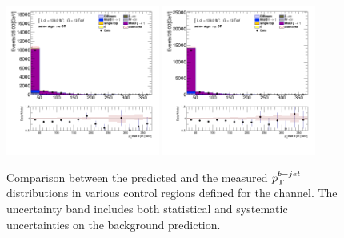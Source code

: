 \begin{figure}[!htp]
\begin{center}
			\includegraphics[width=0.45\textwidth]{chapters/chapter6_HPlus/images/taulep/bjet_0_pt_SS_TAUEL.png} 
			\includegraphics[width=0.45\textwidth]{chapters/chapter6_HPlus/images/taulep/bjet_0_pt_SS_TAUMU.png} \\
			\end{center}
			\caption{
			Comparison between the predicted and the measured $p_{\text{T}}^{b-jet}$ distributions in various control regions defined for the \taulep channel. The uncertainty band includes both statistical and systematic uncertainties on the background prediction. 
			}
			\label{fig:bkg-pt-bjet-taulep}
		\end{figure}